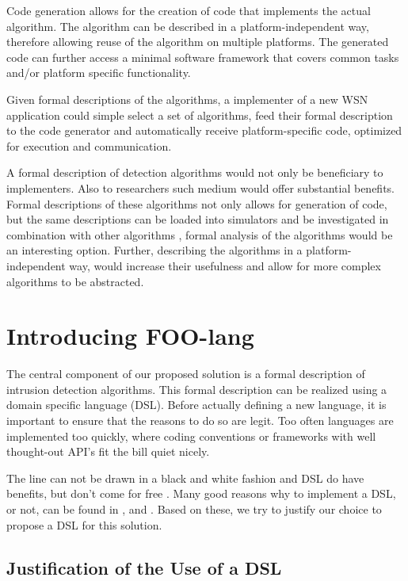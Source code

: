 \documentclass[conference]{IEEEtran}
\begin{document}
Code generation allows for the creation of code that implements the actual
algorithm. The algorithm can be described in a platform-independent way,
therefore allowing reuse of the algorithm on multiple platforms. The generated
code can further access a minimal software framework that covers common tasks
and/or platform specific functionality.

Given formal descriptions of the algorithms, a implementer of a new WSN
application could simple select a set of algorithms, feed their formal
description to the code generator and automatically receive platform-specific
code, optimized for execution and communication.

A formal description of detection algorithms would not only be beneficiary to
implementers. Also to researchers such medium would offer substantial benefits.
Formal descriptions of these algorithms not only allows for generation of code,
but the same descriptions can be loaded into simulators and be investigated in
combination with other algorithms \cite{mernik2005and}, formal analysis of the
algorithms would be an interesting option. Further, describing the algorithms
in a platform-independent way, would increase their usefulness and allow for
more complex algorithms to be abstracted.

\section{Introducing FOO-lang}
\label{section:foo-lang}

The central component of our proposed solution is a formal description of
intrusion detection algorithms. This formal description can be realized using a
domain specific language (DSL). Before actually defining a new language, it is
important to ensure that the reasons to do so are legit. Too often languages are
implemented too quickly, where coding conventions or frameworks with well
thought-out API's fit the bill quiet nicely.

The line can not be drawn in a black and white fashion and DSL do have
benefits, but don't come for free \cite{mernik2005and}. Many good reasons why
to implement a DSL, or not, can be found in \cite{van2000domain},
\cite{mernik2005and} and \cite{fowler2010domain}. Based on these, we try to
justify our choice to propose a DSL for this solution.

\subsection{Justification of the Use of a DSL}
\label{subsection:justification}
\end{document}
